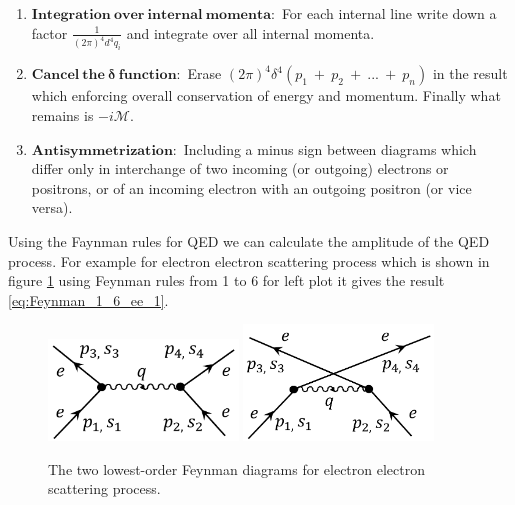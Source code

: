 \begin{enumerate}
\item $\mathbf{Integration~over~internal~momenta:}$ For each internal line write down a factor $\frac{1}{(2\pi)^{4}d^{4}q_{i}}$ and integrate over all internal momenta.
\item $\mathbf{Cancel~the~\delta~function:}$ Erase $(2\pi)^{4}\delta^{4}(p_{1}~+~p_{2}~+~...~+~p_{n})$ in the result which enforcing overall conservation of energy and momentum. Finally what remains is $-i\mathcal{M}$.
\item $\mathbf{Antisymmetrization:}$ Including a minus sign between diagrams which differ only in interchange of two incoming (or outgoing) electrons or positrons, or of an incoming electron with an outgoing positron (or vice versa).
\end{enumerate}

Using the Faynman rules for QED we can calculate the amplitude of the QED process. For example for electron electron scattering process which is shown in figure \ref{fig:feynman_scatter_ee} using Feynman rules from 1 to 6 for left plot it gives the result \ref{eq:Feynman_1_6_ee_1}.

\begin{figure}[h!]
 \begin{center}
\includegraphics[width=0.45\textwidth]{figures/theory/feynman_scatter_ee_1.png}
\includegraphics[width=0.45\textwidth]{figures/theory/feynman_scatter_ee_2.png}
\caption{The two lowest-order Feynman diagrams for electron electron scattering process.}
  \label{fig:feynman_scatter_ee}
 \end{center}
\end{figure}


